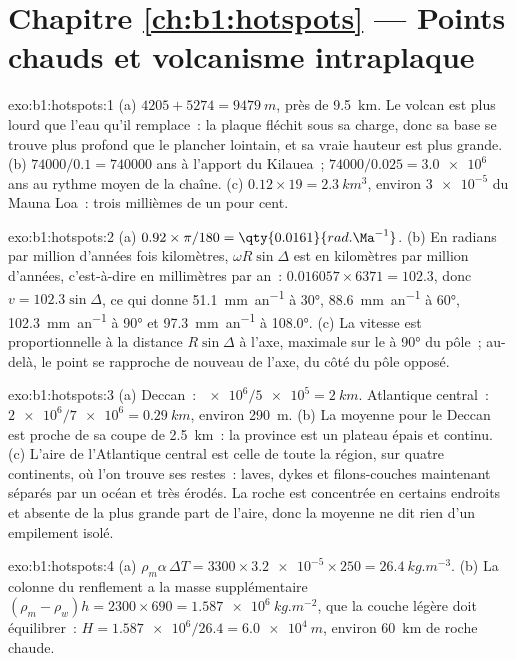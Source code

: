 \section*{Chapitre \ref{ch:b1:hotspots} --- Points chauds et volcanisme intraplaque}

\begin{solution}{exo:b1:hotspots:1}
(a) $4205 + 5274 = \qty{9479}{m}$, près de \qty{9.5}{km}. Le volcan est
plus lourd que l'eau qu'il remplace~: la plaque fléchit sous sa charge, donc
sa base se trouve plus profond que le plancher lointain, et sa vraie hauteur est plus grande.
(b) $74000/0.1 = \num{740000}$ ans à l'apport du Kilauea~;
$74000/0.025 = \num{3.0e6}$ ans au rythme moyen de la chaîne. (c)
$0.12\times19 = \qty{2.3}{km^3}$, environ $\num{3e-5}$ du Mauna Loa~: trois
millièmes de un pour cent.
\end{solution}

\begin{solution}{exo:b1:hotspots:2}
(a) $0.92\times\pi/180 = \qty{0.0161}{rad.\Ma^{-1}}$. (b) En radians par
million d'années fois kilomètres, $\omega R\sin\Delta$ est en kilomètres par
million d'années, c'est-à-dire en millimètres par an~: $0.016057\times6371 = 102.3$, donc
$v = 102.3\sin\Delta$, ce qui donne \qty{51.1}{mm.an^{-1}} à \ang{30},
\qty{88.6}{mm.an^{-1}} à \ang{60}, \qty{102.3}{mm.an^{-1}} à \ang{90} et
\qty{97.3}{mm.an^{-1}} à \ang{108.0}. (c) La vitesse est proportionnelle à la
distance $R\sin\Delta$ à l'axe, maximale sur le  à \ang{90}
du pôle~; au-delà, le point se rapproche de nouveau de l'axe, du
côté du pôle opposé.
\end{solution}

\begin{solution}{exo:b1:hotspots:3}
(a) Deccan~: $\num{e6}/\num{5e5} = \qty{2}{km}$. Atlantique central~:
$\num{2e6}/\num{7e6} = \qty{0.29}{km}$, environ \qty{290}{m}. (b) La moyenne pour
le Deccan est proche de sa coupe de \qty{2.5}{km}~: la province est un plateau épais et
continu. (c) L'aire de l'Atlantique central
est celle de toute la région, sur quatre continents, où l'on trouve ses
restes~: laves, dykes et filons-couches maintenant séparés par un océan et très
érodés. La roche est concentrée en certains endroits et absente de la plus grande
part de l'aire, donc la moyenne ne dit rien d'un empilement isolé.
\end{solution}

\begin{solution}{exo:b1:hotspots:4}
(a) $\rho_m\alpha\,\Delta T = 3300\times\num{3.2e-5}\times250 =
\qty{26.4}{kg.m^{-3}}$. (b) La colonne du renflement a la masse supplémentaire
$(\rho_m - \rho_w)h = 2300\times690 = \qty{1.587e6}{kg.m^{-2}}$, que la
couche légère doit équilibrer~: $H = \num{1.587e6}/26.4 = \qty{6.0e4}{m}$, environ
\qty{60}{km} de roche chaude.
\end{solution}

